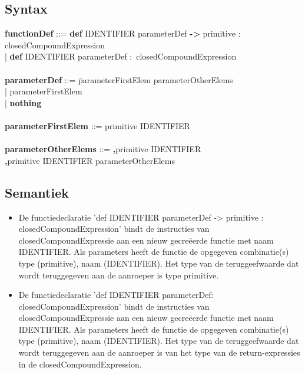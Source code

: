     \subsection{Syntax}
        \begin{tabbing}
            {\bf functionDef}                 ::= \= \textbf{def} IDENTIFIER parameterDef \textbf{->} primitive \textbf{$\colon$} closedCompoundExpression\\
                                                  \>| \textbf{def} IDENTIFIER parameterDef \textbf{$\colon$} closedCompoundExpression\\
            \\
            {\bf parameterDef}                ::= \=parameterFirstElem parameterOtherElems\\
                                                  \>| parameterFirstElem\\
                                                  \>| \textbf{nothing}\\
            \\
            {\bf parameterFirstElem}          ::= primitive IDENTIFIER\\
            \\
            {\bf parameterOtherElems}         ::= \=\textbf{,}primitive IDENTIFIER\\
                                                  \>\textbf{,}primitive IDENTIFIER parameterOtherElems\\  
        \end{tabbing}
    \subsection{Semantiek}
        \begin{itemize}
        \item De functiedeclaratie 'def IDENTIFIER parameterDef -> primitive : closedCompoundExpression' bindt de instructies van closedCompoundExpressie aan een nieuw gecre\"{e}erde functie met naam IDENTIFIER. Als parameters heeft de functie de opgegeven combinatie(s) type (primitive), naam (IDENTIFIER). Het type van de teruggeefwaarde dat wordt teruggegeven aan de aanroeper is type primitive.
        \item De functiedeclaratie 'def IDENTIFIER parameterDef: closedCompoundExpression' bindt de instructies van closedCompoundExpressie aan een nieuw gecre\"{e}erde functie met naam IDENTIFIER. Als parameters heeft de functie de opgegeven combinatie(s) type (primitive), naam (IDENTIFIER). Het type van de teruggeefwaarde dat wordt teruggegeven aan de aanroeper is van het type van de return-expressies in de closedCompoundExpression.
        \end{itemize}

